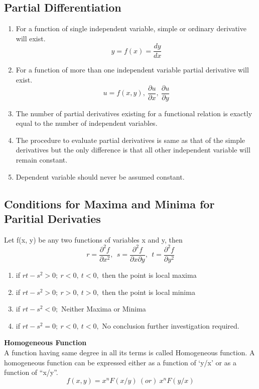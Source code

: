 \subsection{Partial Differentiation}
\begin{enumerate}
    \item For a function of single independent variable, simple or ordinary derivative will exist.
    \[y=f(x)=\frac{dy}{dx} \]
    \item For a function of more than one independent variable partial derivative will exist.
    \[u=f(x,y),\ \frac{\partial u}{\partial x},\ \frac{\partial u}{\partial y}\]
    \item The number of partial derivatives existing for a functional relation is exactly equal to the number of independent variables.
    \item The procedure to evaluate partial derivatives is same as that of the simple derivatives but the only difference is that all other independent variable will remain constant.
    \item Dependent variable should never be assumed constant. 
\end{enumerate}

\subsection*{Conditions for Maxima and Minima for Paritial Derivaties}
Let f(x, y) be any two functions of variables x and y, then
\[r=\frac{\partial^2f}{\partial x^2},\ \ s=\frac{\partial^2f}{\partial x\partial y}, \ \ t = \frac{\partial^2f}{\partial y^2}\]
\begin{enumerate}
    \item if \(rt-s^2>0;\ r<0,\ t<0,\) then the point is local maxima
    \item if \(rt-s^2>0;\ r>0,\ t>0,\) then the point is local minima
    \item if \(rt-s^2<0;\) Neither Maxima or Minima
    \item if \(rt-s^2=0;\ r<0,\ t<0,\) No conclusion further investigation required.
\end{enumerate}
\textbf{Homogeneous Function}\\
A function having same degree in all its terms is called Homogeneous function. A homogeneous function can be expressed either as a function of `y/x' or as a function of ``x/y''.
\[f(x, y)=x^nF(x/y)\  (or)\ x^n F(y/x) \]
